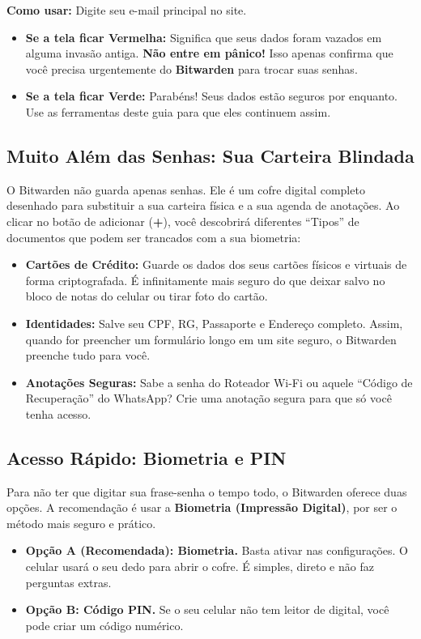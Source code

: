 \textbf{Como usar:} Digite seu e-mail principal no site. 
\begin{itemize}
	\item \textbf{Se a tela ficar Vermelha:} Significa que seus dados foram vazados em alguma invasão antiga. \textbf{Não entre em pânico!} Isso apenas confirma que você precisa urgentemente do \textbf{Bitwarden} para trocar suas senhas.
	\item \textbf{Se a tela ficar Verde:} Parabéns! Seus dados estão seguros por enquanto. Use as ferramentas deste guia para que eles continuem assim.
\end{itemize}

\subsection*{Muito Além das Senhas: Sua Carteira Blindada}

O Bitwarden não guarda apenas senhas. Ele é um cofre digital completo desenhado para substituir a sua carteira física e a sua agenda de anotações. Ao clicar no botão de adicionar (\textbf{+}), você descobrirá diferentes \enquote{Tipos} de documentos que podem ser trancados com a sua biometria:

\begin{itemize}
	\item \textbf{Cartões de Crédito:} Guarde os dados dos seus cartões físicos e virtuais de forma criptografada. É infinitamente mais seguro do que deixar salvo no bloco de notas do celular ou tirar foto do cartão.
	\item \textbf{Identidades:} Salve seu CPF, RG, Passaporte e Endereço completo. Assim, quando for preencher um formulário longo em um site seguro, o Bitwarden preenche tudo para você.
	\item \textbf{Anotações Seguras:} Sabe a senha do Roteador Wi-Fi ou aquele \enquote{Código de Recuperação} do WhatsApp? Crie uma anotação segura para que só você tenha acesso.
\end{itemize}

\subsection*{Acesso Rápido: Biometria e PIN}

Para não ter que digitar sua frase-senha o tempo todo, o Bitwarden oferece duas opções. A recomendação é usar a \textbf{Biometria (Impressão Digital)}, por ser o método mais seguro e prático.

\begin{itemize}
	\item \textbf{Opção A (Recomendada): Biometria.} Basta ativar nas configurações. O celular usará o seu dedo para abrir o cofre. É simples, direto e não faz perguntas extras.
	\item \textbf{Opção B: Código PIN.} Se o seu celular não tem leitor de digital, você pode criar um código numérico. 
\end{itemize}

